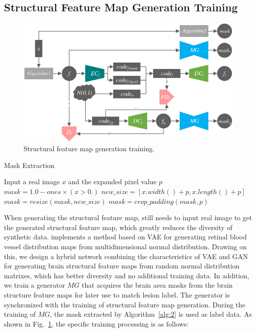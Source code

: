 \documentclass[letterpaper]{article} %
\begin{document}
\subsection{Structural Feature Map Generation Training}
\begin{figure}
	\centering
	\includegraphics[width=0.95\columnwidth]{figures/feature_train}
	\caption{Structural feature map generation training.}
	\label{feature_train}
\end{figure}
\begin{algorithm}
	\caption{Mask Extraction}
	\label{alg:2}
	\begin{algorithmic}[1]
		\State Input a real image $x$ and the expanded pixel value $p$
		\State $mask = 1.0 - ones \times (x > 0.)$
		\State $new\_size=[x.width() + p, x.length() + p]$
		\State $mask = resize(mask, new\_size)$
		\State $mask = crop\_padding(mask,p)$
	\end{algorithmic}  
\end{algorithm}
When generating the structural feature map, \cite{4shin2018medical} still needs to input real image to get the generated structural feature map, which greatly reduces the diversity of synthetic data. \cite{41costa2017towards} implements a method based on VAE for generating retinal blood vessel distribution maps from multidimensional normal distribution. Drawing on this, we design a hybrid network combining the characteristics of VAE and GAN for generating brain structural feature maps from random normal distribution matrixes, which has better diversity and no additional training data. In addition,  we train a generator $MG$ that acquires the brain area masks from the brain structure feature maps for later use to match lesion label. The generator is synchronized with the training of structural feature map generation. During the training of $MG$, the mask extracted by Algorithm~\ref{alg:2} is used as label data. As shown in Fig.~\ref{feature_train}, the specific training processing is as follows:
\end{document}
